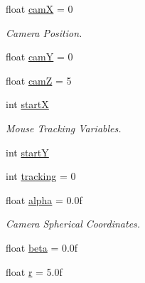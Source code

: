 \begin{DoxyCompactItemize}
float \hyperlink{model_8cu_a1db86c8e9928093303bdc04e7005232d}{cam\-X} = 0
\begin{DoxyCompactList}\small\item\em Camera Position. \end{DoxyCompactList}\item 
float \hyperlink{model_8cu_a1b9c52c561e9ba676e2302e9a76a1f0b}{cam\-Y} = 0
\item 
float \hyperlink{model_8cu_a174bd67f2d4b25dfc51589d53dc84c9e}{cam\-Z} = 5
\item 
int \hyperlink{model_8cu_a85da7669cabd63b0459f1335886dbf2e}{start\-X}
\begin{DoxyCompactList}\small\item\em Mouse Tracking Variables. \end{DoxyCompactList}\item 
int \hyperlink{model_8cu_a7fd8d76428f3da6360d3219bb2b9673a}{start\-Y}
\item 
int \hyperlink{model_8cu_af140661d5ce1ea88b9a8b74bca0a2b6e}{tracking} = 0
\item 
float \hyperlink{model_8cu_ab1551d8043c2aa4410fb7dbb1fe3be7b}{alpha} = 0.\-0f
\begin{DoxyCompactList}\small\item\em Camera Spherical Coordinates. \end{DoxyCompactList}\item 
float \hyperlink{model_8cu_aa773d9a6c0ccefaa0fc9ab66fec68ec1}{beta} = 0.\-0f
\item 
float \hyperlink{model_8cu_a4788d82c901b9367dd5c0daff8a7616b}{r} = 5.\-0f
\end{DoxyCompactItemize}


